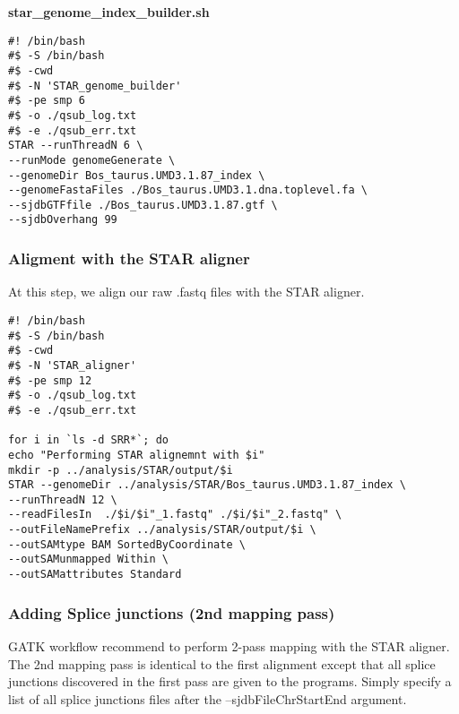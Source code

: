 \textbf{star\_genome\_index\_builder.sh}
\begin{verbatim}
#! /bin/bash
#$ -S /bin/bash
#$ -cwd
#$ -N 'STAR_genome_builder'
#$ -pe smp 6
#$ -o ./qsub_log.txt
#$ -e ./qsub_err.txt
STAR --runThreadN 6 \
--runMode genomeGenerate \
--genomeDir Bos_taurus.UMD3.1.87_index \
--genomeFastaFiles ./Bos_taurus.UMD3.1.dna.toplevel.fa \
--sjdbGTFfile ./Bos_taurus.UMD3.1.87.gtf \
--sjdbOverhang 99
\end{verbatim}






\subsubsection{Aligment with the STAR aligner}

At this step, we align our raw .fastq files with the STAR aligner.

\begin{verbatim}
#! /bin/bash
#$ -S /bin/bash
#$ -cwd
#$ -N 'STAR_aligner'
#$ -pe smp 12
#$ -o ./qsub_log.txt
#$ -e ./qsub_err.txt

for i in `ls -d SRR*`; do
echo "Performing STAR alignemnt with $i"
mkdir -p ../analysis/STAR/output/$i
STAR --genomeDir ../analysis/STAR/Bos_taurus.UMD3.1.87_index \
--runThreadN 12 \
--readFilesIn  ./$i/$i"_1.fastq" ./$i/$i"_2.fastq" \
--outFileNamePrefix ../analysis/STAR/output/$i \
--outSAMtype BAM SortedByCoordinate \
--outSAMunmapped Within \
--outSAMattributes Standard
\end{verbatim}



\subsubsection{Adding Splice junctions (2nd mapping pass)}

GATK workflow recommend to perform 2-pass mapping with the STAR aligner. The 2nd mapping pass is identical to the first alignment except that all splice junctions discovered in the first pass are given to the programs. Simply specify a list of all splice junctions files after the --sjdbFileChrStartEnd argument.


